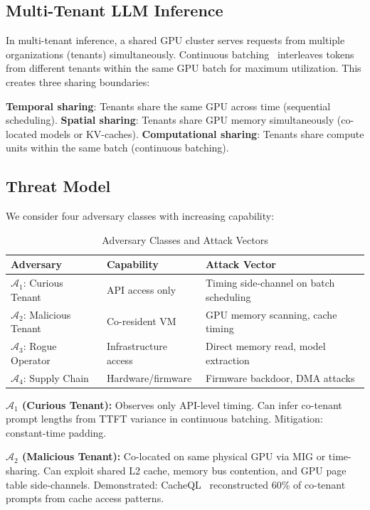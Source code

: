 \documentclass[conference,10pt]{IEEEtran}
\begin{document}
\subsection{Multi-Tenant LLM Inference}

In multi-tenant inference, a shared GPU cluster serves requests from multiple organizations (tenants) simultaneously. Continuous batching~\cite{yu2022orca} interleaves tokens from different tenants within the same GPU batch for maximum utilization. This creates three sharing boundaries:

\textbf{Temporal sharing}: Tenants share the same GPU across time (sequential scheduling). \textbf{Spatial sharing}: Tenants share GPU memory simultaneously (co-located models or KV-caches). \textbf{Computational sharing}: Tenants share compute units within the same batch (continuous batching).

\subsection{Threat Model}

We consider four adversary classes with increasing capability:

\begin{table}[!htbp]
\caption{Adversary Classes and Attack Vectors}
\label{tab:threat}
\centering\footnotesize
\begin{tabular}{@{}llp{3.2cm}@{}}
\toprule
\textbf{Adversary} & \textbf{Capability} & \textbf{Attack Vector} \\
\midrule
$\mathcal{A}_1$: Curious Tenant & API access only & Timing side-channel on batch scheduling \\
$\mathcal{A}_2$: Malicious Tenant & Co-resident VM & GPU memory scanning, cache timing \\
$\mathcal{A}_3$: Rogue Operator & Infrastructure access & Direct memory read, model extraction \\
$\mathcal{A}_4$: Supply Chain & Hardware/firmware & Firmware backdoor, DMA attacks \\
\bottomrule
\end{tabular}
\end{table}

\textbf{$\mathcal{A}_1$ (Curious Tenant):} Observes only API-level timing. Can infer co-tenant prompt lengths from TTFT variance in continuous batching. Mitigation: constant-time padding.

\textbf{$\mathcal{A}_2$ (Malicious Tenant):} Co-located on same physical GPU via MIG or time-sharing. Can exploit shared L2 cache, memory bus contention, and GPU page table side-channels. Demonstrated: CacheQL~\cite{cacheql2024} reconstructed 60\% of co-tenant prompts from cache access patterns.
\end{document}
